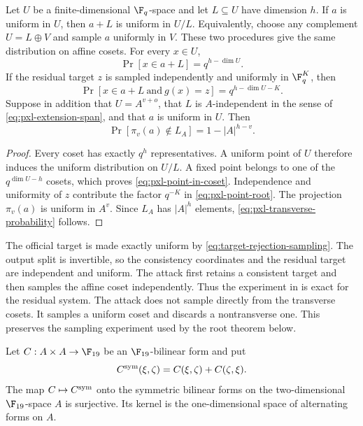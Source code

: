 \begin{lemma}
\label{lem:pxl-uniform-coset}
Let $U$ be a finite-dimensional $\F_q$-space and let $L\subseteq U$ have
dimension $h$.  If $a$ is uniform in $U$, then $a+L$ is uniform in $U/L$.
Equivalently, choose any complement $U=L\oplus V$ and sample $a$ uniformly
in $V$.  These two procedures give the same distribution on affine cosets.
For every $x\in U$,
\begin{equation}
 \Pr[x\in a+L]=q^{h-\dim U}.
 \label{eq:pxl-point-in-coset}
\end{equation}
If the residual target $z$ is sampled independently and uniformly in
$\F_q^K$, then
\begin{equation}
 \Pr[x\in a+L\ \text{and}\ g(x)=z]
 =q^{h-\dim U-K}.
 \label{eq:pxl-point-root}
\end{equation}
Suppose in addition that $U=A^{v+o}$, that $L$ is $A$-independent in the
sense of \eqref{eq:pxl-extension-span}, and that $a$ is uniform in $U$.
Then
\begin{equation}
 \Pr[\pi_v(a)\notin L_A]=1-|A|^{h-v}.
 \label{eq:pxl-transverse-probability}
\end{equation}
\end{lemma}

\begin{proof}
Every coset has exactly $q^h$ representatives.  A uniform point of $U$
therefore induces the uniform distribution on $U/L$.  A fixed point belongs
to one of the $q^{\dim U-h}$ cosets, which proves
\eqref{eq:pxl-point-in-coset}.  Independence and uniformity of $z$ contribute
the factor $q^{-K}$ in \eqref{eq:pxl-point-root}.  The projection
$\pi_v(a)$ is uniform in $A^v$.  Since $L_A$ has $|A|^h$ elements,
\eqref{eq:pxl-transverse-probability} follows.
\end{proof}

The official target is made exactly uniform by
\eqref{eq:target-rejection-sampling}.  The output split is invertible, so the
consistency coordinates and the residual target are independent and uniform.
The attack first retains a consistent target and then samples the affine
coset independently.  Thus the experiment in 
is exact for the residual system.  The attack does not sample directly from
the transverse cosets.  It samples a uniform coset and discards a
nontransverse one.  This preserves the sampling experiment used by the root
theorem below.

\begin{lemma}
\label{lem:pxl-l2-mixed-block}
Let $C:A\times A\to\F_{19}$ be an $\F_{19}$-bilinear form and put
\[
 C^{\rm sym}(\xi,\zeta)=C(\xi,\zeta)+C(\zeta,\xi).
\]
The map $C\mapsto C^{\rm sym}$ onto the symmetric bilinear forms on the
two-dimensional $\F_{19}$-space $A$ is surjective.  Its kernel is the
one-dimensional space of alternating forms on $A$.
\end{lemma}

